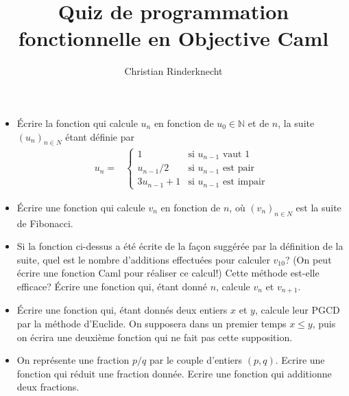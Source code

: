 \documentclass[11pt, a4paper]{article}
\title{Quiz de programmation fonctionnelle en Objective Caml}
\author{Christian Rinderknecht}
\begin{document}
\maketitle

\begin{itemize}

  \item Écrire la fonction qui calcule $u_n$ en fonction de $u_0\in
    \mathbb{N}$ et de $n$, la suite $(u_n)_{n\in N}$ étant définie par
\[ \begin{array}{ll}
   u_n = & \left\{ \begin{array}{ll}
                  1 & \mbox{si $u_{n-1}$ vaut $1$} \\
                  u_{n-1}/2 & \mbox{si $u_{n-1}$ est pair} \\
                  3 u_{n-1}+1 & \mbox{si $u_{n-1}$ est impair}
                 \end{array}
        \right.
   \end{array}
\]

\item Écrire une fonction qui calcule $v_n$ en fonction de $n$, où
      $(v_n)_{n\in N}$ est la suite de Fibonacci.

\item Si la fonction ci-dessus a été écrite de la façon suggérée par
      la définition de la suite, quel est le nombre d'additions
      effectuées pour calculer $v_{10}$? (On peut écrire une fonction
      Caml pour réaliser ce calcul!) Cette méthode est-elle efficace?
      Écrire une fonction qui, étant donné $n$, calcule $v_n$ et
      $v_{n+1}$.

\item Écrire une fonction qui, étant donnés deux entiers $x$ et $y$,
      calcule leur PGCD par la méthode d'Euclide. On supposera dans un
      premier temps $x \leq y$, puis on écrira une deuxième fonction
      qui ne fait pas cette supposition.

\item On représente une fraction $p/q$ par le couple d'entiers $(p,
  q)$. Ecrire une fonction qui réduit une fraction donnée. Ecrire une
  fonction qui additionne deux fractions.

\end{itemize}
\end{document}
